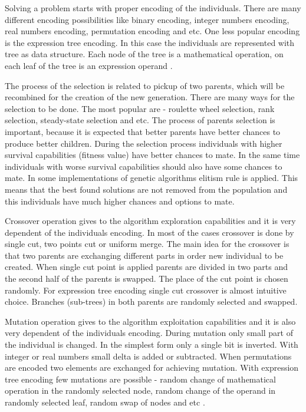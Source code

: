 \documentclass[graybox]{svmult}
\begin{document}
Solving a problem starts with proper encoding of the individuals. There are many different encoding possibilities like binary encoding, integer numbers encoding, real numbers encoding, permutation encoding and etc. One less popular encoding is the expression tree encoding. In this case the individuals are represented with tree as data structure. Each node of the tree is a mathematical operation, on each leaf of the tree is an expression operand \cite{mirjalili01, zhang01}. 

The process of the selection is related to pickup of two parents, which will be recombined for the creation of the new generation. There are many ways for the selection to be done. The most popular are - roulette wheel selection, rank selection, steady-state selection and etc. The process of parents selection is important, because it is expected that better parents have better chances to produce better children. During the selection process individuals with higher survival capabilities (fitness value) have better chances to mate. In the same time individuals with worse survival capabilities should also have some chances to mate. In some implementations of genetic algorithms elitism rule is applied. This means that the best found solutions are not removed from the population and this individuals have much higher chances and options to mate. 

Crossover operation gives to the algorithm exploration capabilities and it is very dependent of the individuals encoding. In most of the cases crossover is done by single cut, two points cut or uniform merge. The main idea for the crossover is that two parents are exchanging different parts in order new individual to be created. When single cut point is applied parents are divided in two parts and the second half of the parents is swapped. The place of the cut point is chosen randomly. For expression tree encoding single cut crossover is almost intuitive choice. Branches (sub-trees) in both parents are randomly selected and swapped. 

Mutation operation gives to the algorithm exploitation capabilities and it is also very dependent of the individuals encoding. During mutation only small part of the individual is changed. In the simplest form only a single bit is inverted. With integer or real numbers small delta is added or subtracted. When permutations are encoded two elements are exchanged for achieving mutation. With expression tree encoding few mutations are possible - random change of mathematical operation in the randomly selected node, random change of the operand in randomly selected leaf, random swap of nodes and etc \cite{aljarah01, zhang01}. 
\end{document}
